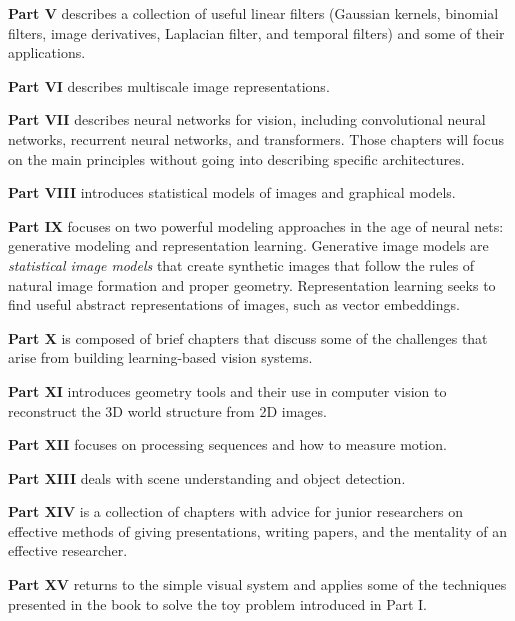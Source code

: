     {\bf Part V} describes a collection of useful linear filters (Gaussian kernels, binomial filters, image derivatives, Laplacian filter, and temporal filters) and some of their applications.

    {\bf Part VI} describes multiscale image representations.

    {\bf Part VII} describes neural networks for vision, including convolutional neural networks, recurrent neural networks, and transformers. Those chapters will focus on the main principles without going into describing specific architectures.

    {\bf Part VIII} introduces statistical models of images and graphical models.

    {\bf Part IX} focuses on two powerful modeling approaches in the age of neural nets: generative modeling and representation learning. Generative image models
are \textit{statistical image models} that create synthetic images that follow the rules of natural image formation and proper geometry. Representation learning seeks to find useful abstract representations of images, such as vector embeddings.

    {\bf Part X} is composed of brief chapters that discuss some of the challenges that arise from building learning-based vision systems.

    {\bf Part XI} introduces geometry tools and their use in computer vision to reconstruct the 3D world structure from 2D images.

    {\bf Part XII} focuses on processing sequences and how to measure motion.

    {\bf Part XIII} deals with scene understanding and object detection.

    {\bf Part XIV} is a collection of chapters with advice for junior researchers on effective methods of giving presentations, writing papers, and the mentality of an effective researcher.

    {\bf Part XV} returns to the simple visual system and applies some of the techniques presented in the book to solve the toy problem introduced in Part I.



